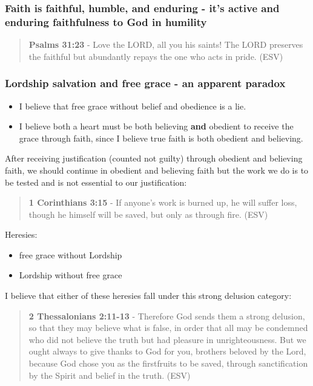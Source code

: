 \documentclass[11pt]{article}
\begin{document}
\subsubsection{Faith is faithful, humble, and enduring - it's active and enduring faithfulness to God in humility}
\label{sec:org65a953d}
\begin{quote}
\textbf{Psalms 31:23} - Love the LORD, all you his saints! The LORD preserves the faithful but abundantly repays the one who acts in pride. (ESV)
\end{quote}

\subsubsection{Lordship salvation and free grace - an apparent paradox}
\label{sec:orgf6adccc}
\begin{itemize}
\item I believe that free grace without belief and obedience is a lie.
\item I believe both a heart must be both believing \textbf{and} obedient to receive the grace through faith, since I believe true faith is both obedient and believing.
\end{itemize}

After receiving justification (counted not guilty) through obedient and believing faith, we should continue in obedient and believing faith but the work we do is to be tested and is not essential to our justification:

\begin{quote}
\textbf{1 Corinthians 3:15} - If anyone's work is burned up, he will suffer loss, though he himself will be saved, but only as through fire. (ESV)
\end{quote}

Heresies:
\begin{itemize}
\item free grace without Lordship
\item Lordship without free grace
\end{itemize}

I believe that either of these heresies fall under this strong delusion category:

\begin{quote}
\textbf{2 Thessalonians 2:11-13} - Therefore God sends them a strong delusion, so that they may believe what is false, in order that all may be condemned who did not believe the truth but had pleasure in unrighteousness.  But we ought always to give thanks to God for you, brothers beloved by the Lord, because God chose you as the firstfruits to be saved, through sanctification by the Spirit and belief in the truth.  (ESV)
\end{quote}
\end{document}

